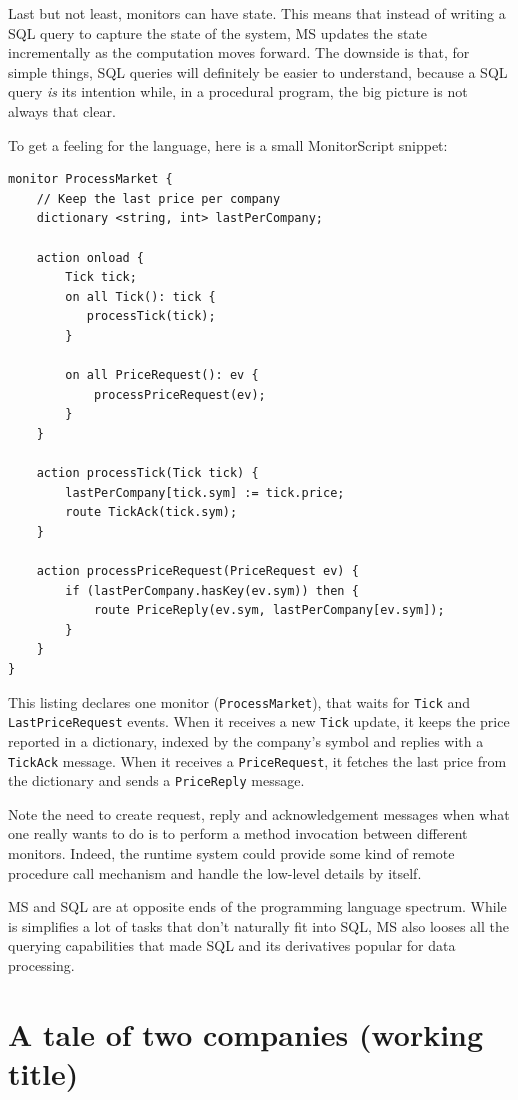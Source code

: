 \documentclass{report}
\begin{document}
Last but not least, monitors can have state. This means that instead
of writing a SQL query to capture the state of the system, MS updates
the state incrementally as the computation moves forward. The downside
is that, for simple things, SQL queries will definitely be easier to
understand, because a SQL query \emph{is} its intention while, in a
procedural program, the big picture is not always that clear.

To get a feeling for the language, here is a small MonitorScript
snippet:

\begin{verbatim}
monitor ProcessMarket {
    // Keep the last price per company
    dictionary <string, int> lastPerCompany;

    action onload {
        Tick tick;
        on all Tick(): tick {
           processTick(tick);
        }

        on all PriceRequest(): ev {
            processPriceRequest(ev);
        }
    }

    action processTick(Tick tick) {
        lastPerCompany[tick.sym] := tick.price;
        route TickAck(tick.sym);
    }

    action processPriceRequest(PriceRequest ev) {
        if (lastPerCompany.hasKey(ev.sym)) then {
            route PriceReply(ev.sym, lastPerCompany[ev.sym]);
        }
    }
}
\end{verbatim}

This listing declares one monitor (\verb=ProcessMarket=), that waits
for \verb=Tick= and \verb=LastPriceRequest= events. When it receives a
new \verb=Tick= update, it keeps the price reported in a dictionary,
indexed by the company's symbol and replies with a \verb=TickAck=
message. When it receives a \verb=PriceRequest=, it fetches the last
price from the dictionary and sends a \verb=PriceReply= message.

Note the need to create request, reply and acknowledgement messages
when what one really wants to do is to perform a method invocation
between different monitors. Indeed, the runtime system could provide
some kind of remote procedure call mechanism and handle the low-level
details by itself.

MS and SQL are at opposite ends of the programming language
spectrum. While is simplifies a lot of tasks that don't naturally fit
into SQL, MS also looses all the querying capabilities that made SQL
and its derivatives popular for data processing.

\chapter{A tale of two companies (working title)}
\label{chap:motivation}
\end{document}
